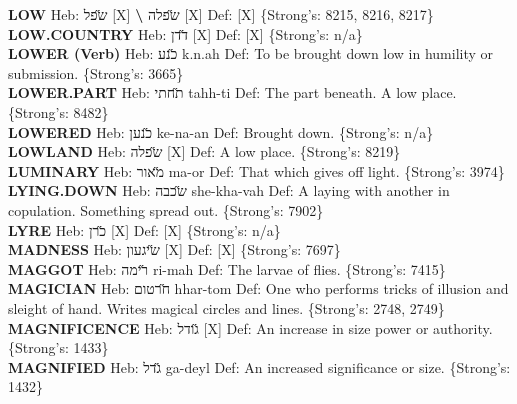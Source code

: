 {\textbf{LOW} Heb: {\large\H שפל} {[}X{]} \textbf{\textbackslash{}} {\large\H שפלה} {[}X{]} Def: {[}X{]} \{Strong's: 8215, 8216, 8217\}\hfill{}\\

\textbf{LOW.COUNTRY} Heb: {\large\H דדן} {[}X{]} Def: {[}X{]} \{Strong's: n/a\}\hfill{}\\

\textbf{LOWER (Verb)} Heb: {\large\H כנע} k.n.ah Def: To be brought down low in humility or submission. \{Strong's: 3665\}\hfill{}\\

\textbf{LOWER.PART} Heb: {\large\H תחתי} tahh-ti Def: The part beneath. A low place. \{Strong's: 8482\}\hfill{}\\

\textbf{LOWERED} Heb: {\large\H כנען} ke-na-an Def: Brought down. \{Strong's: n/a\}\hfill{}\\

\textbf{LOWLAND} Heb: {\large\H שפלה} {[}X{]} Def: A low place. \{Strong's: 8219\}\hfill{}\\

\textbf{LUMINARY} Heb: {\large\H מאור} ma-or Def: That which gives off light. \{Strong's: 3974\}\hfill{}\\

\textbf{LYING.DOWN} Heb: {\large\H שכבה} she-kha-vah Def: A laying with another in copulation. Something spread out. \{Strong's: 7902\}\hfill{}\\

\textbf{LYRE} Heb: {\large\H כרן} {[}X{]} Def: {[}X{]} \{Strong's: n/a\}\hfill{}\\

\textbf{MADNESS} Heb: {\large\H שיגעון} {[}X{]} Def: {[}X{]} \{Strong's: 7697\}\hfill{}\\

\textbf{MAGGOT} Heb: {\large\H רימה} ri-mah Def: The larvae of flies. \{Strong's: 7415\}\hfill{}\\

\textbf{MAGICIAN} Heb: {\large\H חרטום} hhar-tom Def: One who performs tricks of illusion and sleight of hand. Writes magical circles and lines. \{Strong's: 2748, 2749\}\hfill{}\\

\textbf{MAGNIFICENCE} Heb: {\large\H גודל} {[}X{]} Def: An increase in size power or authority. \{Strong's: 1433\}\hfill{}\\

\textbf{MAGNIFIED} Heb: {\large\H גדל} ga-deyl Def: An increased significance or size. \{Strong's: 1432\}\hfill{}\\

}
